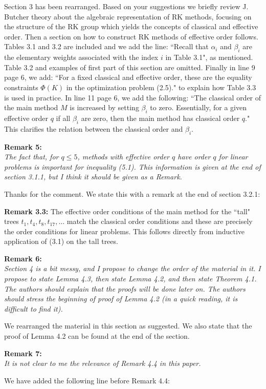 \documentclass[12pt]{article}
\newcommand{\remark}[2]{\vspace{25pt} \noindent \textbf{Remark #1:\newline} \textit{#2}\vspace{15pt}}
\renewcommand{\newline}{\vspace{15pt}\\}
\begin{document}
Section 3 has been rearranged. 
Based on your suggestions we briefly review J. Butcher theory about the algebraic representation
of RK methods, focusing on the structure of the RK group which yields the concepts of classical 
and effective order.
Then a section on how to construct RK methods of effective order follows.
Tables 3.1 and 3.2 are included and we add the line:
``Recall that $\alpha_i$ and $\beta_i$ are the elementary weights associated 
with the index $i$ in Table 3.1",
as mentioned.
Table 3.2 and examples of first part of this section are omitted. 
Finally in line 9 page 6, we add:
``For a fixed classical and effective order, these are the equality constraints 
$\Phi(K)$ in the optimization problem (2.5)."
to explain how Table 3.3 is used in practice.
In line 11 page 6, we add the following:
``The classical order of the main method $M$ is increased by setting $\beta_i$
to zero. 
Essentially, for a given effective order $q$ if all $\beta_i$ are zero, then
the main method has classical order $q$."
This clarifies the relation between the classical order and $\beta_i$.

\remark{5}{
The fact that, for $q \leq 5$, methods with effective order $q$ have order $q$ 
for linear problems is important for inequality (5.1). 
This information is given at the end of section 3.1.1, but I think it should be given as a Remark.}

Thanks for the comment. We state this with a remark at the end of section 3.2.1: 

\textbf{Remark 3.3:} The effective order conditions of the main method for the ``tall" trees 
$t_1, t_4, t_8, t_{17}, \dots$ match the classical order conditions
and these are precisely the order conditions for linear problems.
This follows directly from inductive application of (3.1)
on the tall trees.

\remark{6}{
Section 4 is a bit messy, and I propose to change the order of the material in it. 
I propose to state Lemma 4.3, then state Lemma 4.2, and then state Theorem 4.1. 
The authors should explain that the proofs will be done later on. 
The authors should stress the beginning of proof of Lemma 4.2 (in a quick reading, 
it is difficult to find it).}

We rearranged the material in this section as suggested.
We also state that the proof of Lemma 4.2 can be found at the end of the section.

\remark{7}{
It is not clear to me the relevance of Remark 4.4 in this paper.}

We have added the following line before Remark 4.4:
\end{document}

